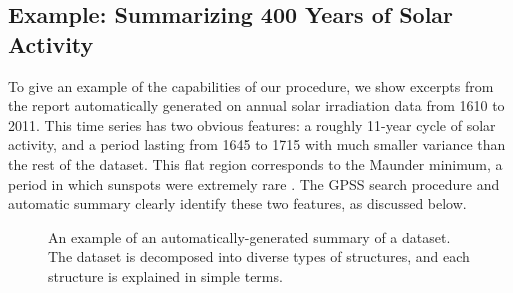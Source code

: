 \documentclass{article} %
\begin{document}
\subsection{Example: Summarizing 400 Years of Solar Activity}
\label{sec:example}
\vspace{-0.1in}

To give an example of the capabilities of our procedure, we show excerpts from the report automatically generated on annual solar irradiation data from 1610 to 2011.  This time series has two obvious features: a roughly 11-year cycle of solar activity, and a period lasting from 1645 to 1715 with much smaller variance than the rest of the dataset.  This flat region corresponds to the Maunder minimum, a period in which sunspots were extremely rare \citep{lean1995reconstruction}.
%
The GPSS search procedure and automatic summary clearly identify these two features, as discussed below.



\begin{figure}[h]
\centering
{}
\caption{
An example of an automatically-generated summary of a dataset.  The dataset is decomposed into diverse types of structures, and each structure is explained in simple terms.}
\label{fig:exec}
\end{figure}
\end{document}

